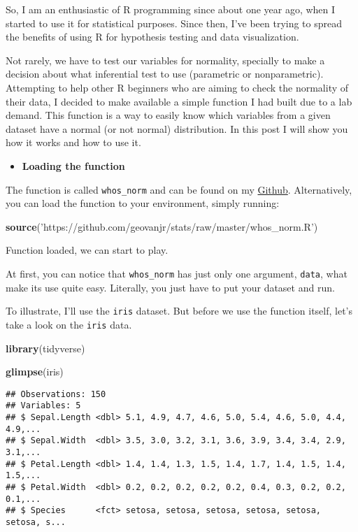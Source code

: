 \documentclass[]{article}
\title{}
\author{Geovan}
\date{18/06/2020}
\newenvironment{Shaded}{}{}
\newcommand{\KeywordTok}[1]{\textcolor[rgb]{0.00,0.44,0.13}{\textbf{#1}}}
\newcommand{\NormalTok}[1]{#1}
\newcommand{\StringTok}[1]{\textcolor[rgb]{0.25,0.44,0.63}{#1}}
\providecommand{\tightlist}{%
  \setlength{\itemsep}{0pt}\setlength{\parskip}{0pt}}
\begin{document}
So, I am an enthusiastic of R programming since about one year ago, when
I started to use it for statistical purposes. Since then, I've been
trying to spread the benefits of using R for hypothesis testing and data
visualization.

Not rarely, we have to test our variables for normality, specially to
make a decision about what inferential test to use (parametric or
nonparametric). Attempting to help other R beginners who are aiming to
check the normality of their data, I decided to make available a simple
function I had built due to a lab demand. This function is a way to
easily know which variables from a given dataset have a normal (or not
normal) distribution. In this post I will show you how it works and how
to use it.

\begin{itemize}
\tightlist
\item
  \textbf{Loading the function}
\end{itemize}

The function is called \texttt{whos\_norm} and can be found on my
\href{https://github.com/geovanjr/stats}{Github}. Alternatively, you can
load the function to your environment, simply running:

\begin{Shaded}
\begin{Highlighting}[]
\KeywordTok{source}\NormalTok{(}\StringTok{'https://github.com/geovanjr/stats/raw/master/whos_norm.R'}\NormalTok{)}
\end{Highlighting}
\end{Shaded}

Function loaded, we can start to play.

At first, you can notice that \texttt{whos\_norm} has just only one
argument, \texttt{data}, what make its use quite easy. Literally, you
just have to put your dataset and run.

To illustrate, I'll use the \texttt{iris} dataset. But before we use the
function itself, let's take a look on the \texttt{iris} data.

\begin{Shaded}
\begin{Highlighting}[]
\KeywordTok{library}\NormalTok{(tidyverse)}

\KeywordTok{glimpse}\NormalTok{(iris)}
\end{Highlighting}
\end{Shaded}

\begin{verbatim}
## Observations: 150
## Variables: 5
## $ Sepal.Length <dbl> 5.1, 4.9, 4.7, 4.6, 5.0, 5.4, 4.6, 5.0, 4.4, 4.9,...
## $ Sepal.Width  <dbl> 3.5, 3.0, 3.2, 3.1, 3.6, 3.9, 3.4, 3.4, 2.9, 3.1,...
## $ Petal.Length <dbl> 1.4, 1.4, 1.3, 1.5, 1.4, 1.7, 1.4, 1.5, 1.4, 1.5,...
## $ Petal.Width  <dbl> 0.2, 0.2, 0.2, 0.2, 0.2, 0.4, 0.3, 0.2, 0.2, 0.1,...
## $ Species      <fct> setosa, setosa, setosa, setosa, setosa, setosa, s...
\end{verbatim}
\end{document}
